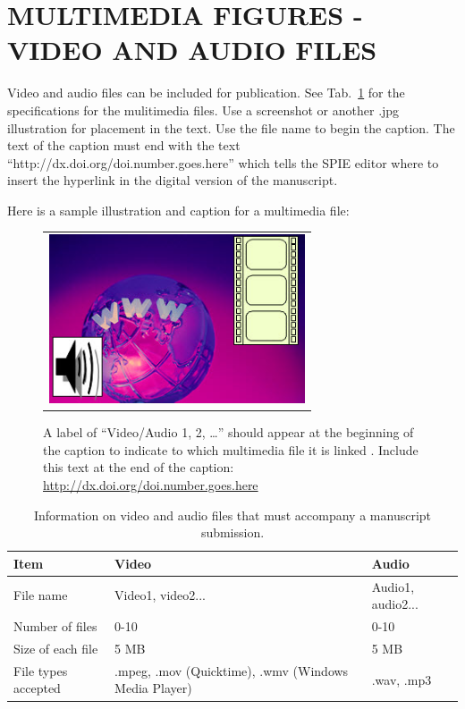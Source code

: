 \documentclass[]{spie}  %
\begin{document}
\section{MULTIMEDIA FIGURES - VIDEO AND AUDIO FILES}

Video and audio files can be included for publication. See Tab.~\ref{tab:Multimedia-Specifications} for the specifications for the mulitimedia files. Use a screenshot or another .jpg illustration for placement in the text. Use the file name to begin the caption. The text of the caption must end with the text ``http://dx.doi.org/doi.number.goes.here'' which tells the SPIE editor where to insert the hyperlink in the digital version of the manuscript. 

Here is a sample illustration and caption for a multimedia file:

   \begin{figure} [ht]
   \begin{center}
   \begin{tabular}{c} 
   \includegraphics[height=5cm]{MultimediaFigure.jpg}
	\end{tabular}
	\end{center}
   \caption[example] 
   { \label{fig:video-example} 
A label of “Video/Audio 1, 2, …” should appear at the beginning of the caption to indicate to which multimedia file it is linked . Include this text at the end of the caption: \url{http://dx.doi.org/doi.number.goes.here}}
   \end{figure} 
   
   \begin{table}[ht]
\caption{Information on video and audio files that must accompany a manuscript submission.} 
\label{tab:Multimedia-Specifications}
\begin{center}       
\begin{tabular}{|l|l|l|}
\hline
\rule[-1ex]{0pt}{3.5ex}  Item & Video & Audio  \\
\hline
\rule[-1ex]{0pt}{3.5ex}  File name & Video1, video2... & Audio1, audio2...   \\
\hline
\rule[-1ex]{0pt}{3.5ex}  Number of files & 0-10 & 0-10  \\
\hline
\rule[-1ex]{0pt}{3.5ex}  Size of each file & 5 MB & 5 MB  \\
\hline
\rule[-1ex]{0pt}{3.5ex}  File types accepted & .mpeg, .mov (Quicktime), .wmv (Windows Media Player) & .wav, .mp3  \\
\hline 
\end{tabular}
\end{center}
\end{table}
\end{document}
